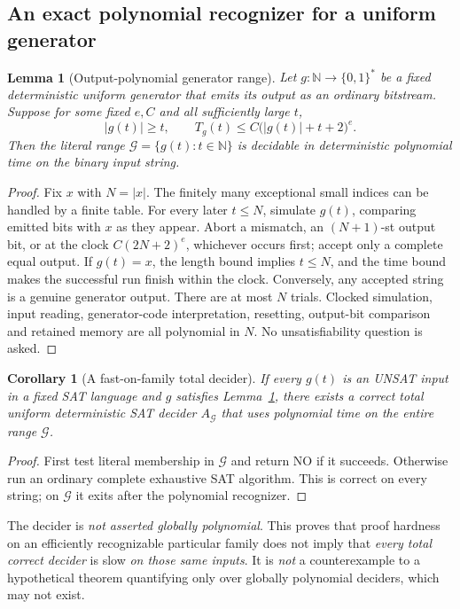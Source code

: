 \documentclass[11pt]{article}
\newtheorem{lemma}[theorem]{Lemma}
\newtheorem{corollary}[theorem]{Corollary}
\begin{document}
\subsection{An exact polynomial recognizer for a uniform generator}
\begin{lemma}[Output-polynomial generator range]\label{lem:range}
Let $g:\mathbb N\to\{0,1\}^*$ be a fixed deterministic uniform
generator that emits its output as an ordinary bitstream. Suppose
for some fixed $e,C$ and all sufficiently large $t$,
\[
 |g(t)|\ge t,\qquad
 T_g(t)\le C\bigl(|g(t)|+t+2\bigr)^e.                    \tag{10}
\]
Then the \emph{literal} range
$\mathcal G=\{g(t):t\in\mathbb N\}$ is decidable in
deterministic polynomial time on the binary input string.
\end{lemma}
\begin{proof}
Fix $x$ with $N=|x|$. The finitely many exceptional small indices
can be handled by a finite table. For every later $t\le N$, simulate
$g(t)$, comparing emitted bits with $x$ as they appear. Abort a
mismatch, an $(N+1)$-st output bit, or at the clock
$C(2N+2)^e$, whichever occurs first; accept only a complete
equal output. If $g(t)=x$, the length bound implies $t\le N$,
and the time bound makes the successful run finish within the
clock. Conversely, any accepted string is a genuine generator
output. There are at most $N$ trials. Clocked simulation,
input reading, generator-code interpretation, resetting,
output-bit comparison and retained memory are all polynomial
in $N$. No unsatisfiability question is asked.
\end{proof}

\begin{corollary}[A fast-on-family total decider]
\label{cor:bypass}
If every $g(t)$ is an UNSAT input in a fixed SAT language and $g$
satisfies Lemma~\ref{lem:range}, there exists a correct total
uniform deterministic SAT decider $A_{\mathcal G}$ that uses
polynomial time on the entire range $\mathcal G$.
\end{corollary}
\begin{proof}
First test literal membership in $\mathcal G$ and return NO if it
succeeds. Otherwise run an ordinary complete exhaustive SAT
algorithm. This is correct on every string; on $\mathcal G$
it exits after the polynomial recognizer.
\end{proof}
\noindent The decider is \emph{not asserted globally polynomial}.
This proves that proof hardness on an efficiently recognizable
particular family does not imply that \emph{every total correct
decider} is slow \emph{on those same inputs}. It is \emph{not}
a counterexample to a hypothetical theorem quantifying only over
globally polynomial deciders, which may not exist.
\end{document}

